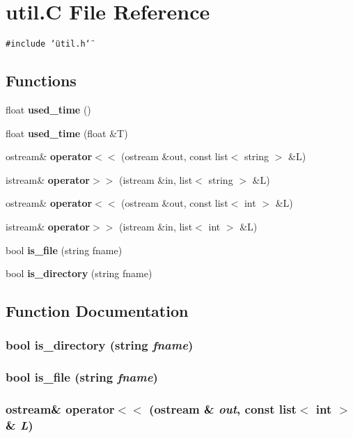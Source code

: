 \section{util.C File Reference}
\label{util_C}
{\tt \#include \char`\"{}util.h\char`\"{}}\par
\subsection*{Functions}
\begin{CompactItemize}
\item 
float {\bf used\_\-time} ()
\item 
float {\bf used\_\-time} (float \&T)
\item 
ostream\& {\bf operator$<$$<$} (ostream \&out, const list$<$ string $>$ \&L)
\item 
istream\& {\bf operator$>$$>$} (istream \&in, list$<$ string $>$ \&L)
\item 
ostream\& {\bf operator$<$$<$} (ostream \&out, const list$<$ int $>$ \&L)
\item 
istream\& {\bf operator$>$$>$} (istream \&in, list$<$ int $>$ \&L)
\item 
bool {\bf is\_\-file} (string fname)
\item 
bool {\bf is\_\-directory} (string fname)
\end{CompactItemize}


\subsection{Function Documentation}
\subsubsection{\setlength{\rightskip}{0pt plus 5cm}bool is\_\-directory (string {\em fname})}\label{util_C_a7}


\subsubsection{\setlength{\rightskip}{0pt plus 5cm}bool is\_\-file (string {\em fname})}\label{util_C_a6}


\subsubsection{\setlength{\rightskip}{0pt plus 5cm}ostream\& operator$<$$<$ (ostream \& {\em out}, const list$<$ int $>$ \& {\em L})}\label{util_C_a4}


